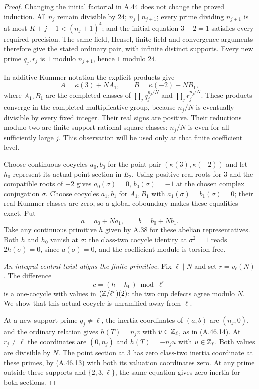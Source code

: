 \begin{proof}
Changing the initial factorial in A.44 does not change the
proved induction.  All $n_j$ remain divisible by $24$;
$n_j\mid n_{j+1}$; every prime dividing $n_{j+1}$ is at most
$K+j+1<(n_j+1)^4$; and the initial equation
$3-2=1$ satisfies every required precision.  The same field,
Hensel, finite-field and convergence arguments therefore give
the stated ordinary pair, with infinite distinct supports.
Every new prime $q_j,r_j$ is $1$ modulo $n_{j+1}$, hence
$1$ modulo $24$.

In additive Kummer notation the explicit products give
\[
 A=\kappa(3)+N A_1,\qquad
 B=\kappa(-2)+N B_1,
 \tag{A.52.3}
\]
where $A_1,B_1$ are the completed classes of
$\prod_jq_j^{n_j/N}$ and $\prod_jr_j^{n_j/N}$.
These products converge in the completed multiplicative group,
because $n_j/N$ is eventually divisible by every fixed integer.
Their real signs are positive.  Their reductions modulo two
are finite-support rational square classes: $n_j/N$ is even
for all sufficiently large $j$.  This observation will be used
only at that finite coefficient level.

Choose continuous cocycles $a_0,b_0$ for the point pair
$(\kappa(3),\kappa(-2))$ and let $h_0$ represent its actual
point section in $E_2$.  Using positive real roots for $3$
and the compatible roots of $-2$ gives
$a_0(\sigma)=0$, $b_0(\sigma)=-1$ at the chosen complex
conjugation $\sigma$.  Choose cocycles $a_1,b_1$ for
$A_1,B_1$ with $a_1(\sigma)=b_1(\sigma)=0$; their real
Kummer classes are zero, so a global coboundary makes these
equalities exact.  Put
\[
              a=a_0+Na_1,\qquad b=b_0+Nb_1.
\]
Take any continuous primitive $h$ given by A.38 for these
abelian representatives.  Both $h$ and $h_0$ vanish at
$\sigma$: the class-two cocycle identity at $\sigma^2=1$
reads $2h(\sigma)=0$, since $a(\sigma)=0$, and the coefficient
module is torsion-free.

\emph{An integral central twist aligns the finite primitive.}
Fix $\ell\mid N$ and set $r=v_\ell(N)$.
The difference
\[
               c=(h-h_0)\bmod\ell^r
 \tag{A.52.4}
\]
is a one-cocycle with values in $(\mathbb Z/\ell^r)(2)$: the two
cup defects agree modulo $N$.  We show that this actual
cocycle is unramified away from $\ell$.

At a new support prime $q_j\ne\ell$, the inertia coordinates
of $(a,b)$ are $(n_j,0)$, and the ordinary relation gives
$h(T)=n_jv$ with $v\in\mathbb Z_\ell$, as in (A.46.14).
At $r_j\ne\ell$ the coordinates are $(0,n_j)$ and
$h(T)=-n_ju$ with $u\in\mathbb Z_\ell$.
Both values are divisible by $N$.  The point section at $3$
has zero class-two inertia coordinate at these primes, by
(A.46.13) with both its valuation coordinates zero.
At any prime outside these supports and $\{2,3,\ell\}$,
the same equation gives zero inertia for both sections.


\end{proof}
